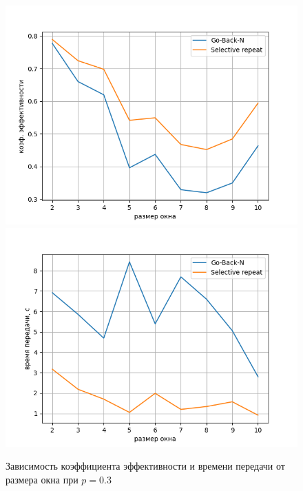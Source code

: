 \begin{figure}[H]
	\begin{center}
		\includegraphics[scale=0.52]{fig3}
		\includegraphics[scale=0.52]{fig4}
		\caption{Зависимость коэффициента эффективности и времени передачи от размера окна при $p = 0.3$}
	\end{center}
\end{figure}

